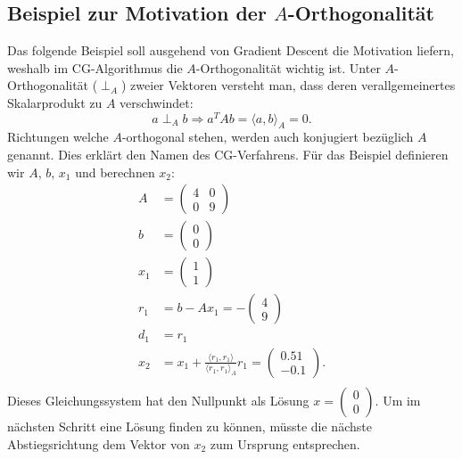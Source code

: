 \subsection{Beispiel zur Motivation der $A$-Orthogonalität} \label{cg:subsec:aortho}
Das folgende Beispiel soll ausgehend von Gradient Descent die Motivation liefern, weshalb im CG-Algorithmus die $A$-Orthogonalität wichtig ist.
Unter $A$-Orthogonalität ($\perp_A$) zweier Vektoren versteht man, dass deren verallgemeinertes Skalarprodukt zu $A$ verschwindet:
\begin{equation}
	a \perp_A b \Longrightarrow a^T A b = \langle a , b \rangle_A = 0.
\end{equation}
Richtungen welche $A$-orthogonal stehen, werden auch konjugiert bezüglich $A$ genannt.
Dies erklärt den Namen des CG-Verfahrens.
Für das Beispiel definieren wir $A$, $b$, $x_1$ und berechnen $x_2$:
\begin{align}\nonumber
	A 	&= 		\begin{pmatrix}
				4 & 0\\
				0 & 9 
				\end{pmatrix} \nonumber\\
	b 	&= 		\begin{pmatrix}
				0\\
				0
				\end{pmatrix} \nonumber\\
	x_1 &= 		\begin{pmatrix}
				1\\
				1
				\end{pmatrix} \nonumber\\
	r_1	&= 		b - A x_1 = - 	\begin{pmatrix}
								4\\
								9
								\end{pmatrix} \nonumber\\
	d_1 &= r_1 \nonumber\\
	x_2 &= x_1 + \frac{\langle r_1 , r_1 \rangle}{\langle r_1 , r_1 \rangle_A} r_1 = 	\begin{pmatrix}
																						0.51\\
																						-0.1
																						\end{pmatrix}. \\
\end{align}
Dieses Gleichungssystem hat den Nullpunkt als Lösung $x = \begin{pmatrix}0\\0\end{pmatrix}$.
Um im nächsten Schritt eine Lösung finden zu können, müsste die nächste Abstiegsrichtung dem Vektor von $x_2$ zum Ursprung entsprechen.
